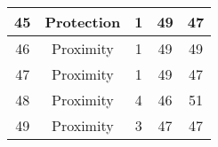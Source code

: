 \documentclass[results.tex]{subfiles}
\begin{document}
\begin{center}
\begin{tabular}{| c || c | c | c | c |}
            \hline
            45                      & Protection                   & 1                      & 49                      & 47                   \\
            \hline
            46                      & Proximity                    & 1                      & 49                      & 49                   \\
            \hline
            47                      & Proximity                    & 1                      & 49                      & 47                   \\
            \hline
            48                      & Proximity                    & 4                      & 46                      & 51                   \\
            \hline
            49                      & Proximity                    & 3                      & 47                      & 47                   \\
            \hline
        \end{tabular}
    \end{center}
\end{document}
